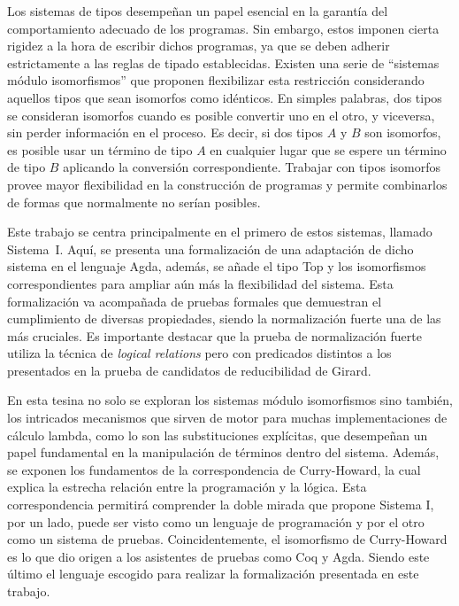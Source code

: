 Los sistemas de tipos desempeñan un papel esencial en la garantía del comportamiento adecuado de los programas.
Sin embargo, estos imponen cierta rigidez a la hora de escribir dichos programas, ya que se deben adherir estrictamente a las reglas de tipado establecidas.
Existen una serie de ``sistemas módulo isomorfismos'' \cite{system-i,lambda-plus,sip} que proponen flexibilizar esta restricción considerando aquellos tipos que sean isomorfos como idénticos.
En simples palabras, dos tipos se consideran isomorfos cuando es posible convertir uno en el otro, y viceversa, sin perder información en el proceso.
Es decir, si dos tipos $A$ y $B$ son isomorfos, es posible usar un término de tipo $A$ en cualquier lugar que se espere un término de tipo $B$ aplicando la conversión correspondiente.
Trabajar con tipos isomorfos provee mayor flexibilidad en la construcción de programas y permite combinarlos de formas que normalmente no serían posibles.

Este trabajo se centra principalmente en el primero de estos sistemas, llamado Sistema~I.
Aquí, se presenta una formalización de una adaptación de dicho sistema en el lenguaje Agda, además, se añade el tipo Top y los isomorfismos correspondientes para ampliar aún más la flexibilidad del sistema.
Esta formalización va acompañada de pruebas formales que demuestran el cumplimiento de diversas propiedades, siendo la normalización fuerte una de las más cruciales.
Es importante destacar que la prueba de normalización fuerte utiliza la técnica de \textit{logical relations} pero con predicados distintos a los presentados en la prueba de candidatos de reducibilidad de Girard.

En esta tesina no solo se exploran los sistemas módulo isomorfismos sino también, los intricados mecanismos que sirven de motor para muchas implementaciones de cálculo lambda, como lo son las substituciones explícitas, que desempeñan un papel fundamental en la manipulación de términos dentro del sistema.
Además, se exponen los fundamentos de la correspondencia de Curry-Howard, la cual explica la estrecha relación entre la programación y la lógica.
Esta correspondencia permitirá comprender la doble mirada que propone Sistema I, por un lado, puede ser visto como un lenguaje de programación y por el otro como un sistema de pruebas.
Coincidentemente, el isomorfismo de Curry-Howard es lo que dio origen a los asistentes de pruebas como Coq y Agda.
Siendo este último el lenguaje escogido para realizar la formalización presentada en este trabajo.